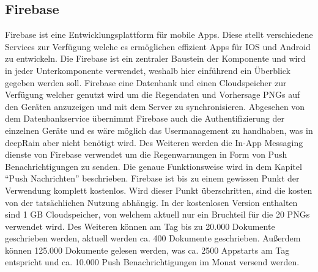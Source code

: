 \subsection{Firebase}\label{firebase}
Firebase ist eine Entwicklungsplattform für mobile Apps. Diese stellt verschiedene Services zur Verfügung welche es ermöglichen effizient Apps für IOS und Android zu entwickeln. Die Firebase ist ein zentraler Baustein der Komponente und wird in jeder Unterkomponente verwendet, weshalb hier einführend ein Überblick gegeben werden soll. Firebase eine Datenbank und einen Cloudspeicher zur Verfügung welcher genutzt wird um die Regendaten und Vorhersage PNGs auf den Geräten anzuzeigen und mit dem Server zu synchronisieren. Abgesehen von dem Datenbankservice übernimmt Firebase auch die Authentifizierung der einzelnen Geräte und es wäre möglich das Usermanagement zu handhaben, was in deepRain aber nicht benötigt wird. Des Weiteren werden die In-App Messaging dienste von Firebase verwendet um die Regenwarnungen in Form von Push Benachrichtigungen zu senden. Die genaue Funktionsweise wird in dem Kapitel “Push Nachrichten” beschrieben.   
Firebase ist bis zu einem gewissen Punkt der Verwendung komplett kostenlos. Wird dieser Punkt überschritten, sind die kosten von der tatsächlichen Nutzung abhängig. In der kostenlosen Version enthalten sind 1 GB Cloudspeicher, von welchem aktuell nur ein Bruchteil für die 20 PNGs verwendet wird. Des Weiteren können am Tag bis zu 20.000 Dokumente geschrieben werden, aktuell werden ca. 400 Dokumente geschrieben. Außerdem können 125.000 Dokumente gelesen werden, was ca. 2500 Appstarts am Tag entspricht und ca. 10.000 Push Benachrichtigungen im Monat versend werden.   